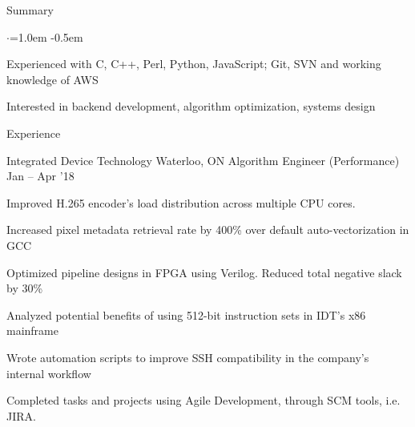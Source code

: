 \documentclass{resume} %
\begin{document}

\begin{rSection}{Summary}
  \vspace{0.5em}
  \begin{list}{$\cdot$}{\leftmargin=1.0em}
    \itemsep -0.5em \vspace{-0.5em}
    \item Experienced with C, C++, Perl, Python, JavaScript; Git, SVN and working knowledge of AWS
	\item Interested in backend development, algorithm optimization, systems design
  \end{list}
  \vspace{0.5em}
\end{rSection}


\begin{rSection}{Experience}
  \begin{rWorkSection}{Integrated Device Technology}
                     {Waterloo, ON}
                     {Algorithm Engineer (Performance)}
                     {Jan -- Apr '18}
    \item Improved H.265 encoder's load distribution across multiple CPU cores.
    \item Increased pixel metadata retrieval rate by 400\% over default 
	  auto-vectorization in GCC
    \item Optimized pipeline designs in FPGA using Verilog. Reduced total
	  negative slack by 30\%
	  \item Analyzed potential benefits of using 512-bit instruction sets in 
	  IDT's x86 mainframe
    \item Wrote automation scripts to improve SSH compatibility in the
	  company's internal workflow
	  \item Completed tasks and projects using Agile Development, through SCM 
    tools, i.e. JIRA.
  \end{rWorkSection}
\end{rSection}
\end{document}
